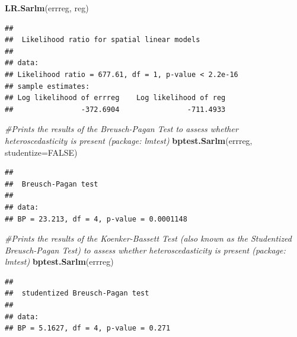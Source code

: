 \documentclass[
]{article}
\newenvironment{Shaded}{\begin{snugshade}}{\end{snugshade}}
\newcommand{\AttributeTok}[1]{\textcolor[rgb]{0.13,0.29,0.53}{#1}}
\newcommand{\CommentTok}[1]{\textcolor[rgb]{0.56,0.35,0.01}{\textit{#1}}}
\newcommand{\ConstantTok}[1]{\textcolor[rgb]{0.56,0.35,0.01}{#1}}
\newcommand{\FunctionTok}[1]{\textcolor[rgb]{0.13,0.29,0.53}{\textbf{#1}}}
\newcommand{\NormalTok}[1]{#1}
\newcommand{\SpecialCharTok}[1]{\textcolor[rgb]{0.81,0.36,0.00}{\textbf{#1}}}
\begin{document}
\begin{Shaded}
\begin{Highlighting}[]
\FunctionTok{LR.Sarlm}\NormalTok{(errreg, reg)}
\end{Highlighting}
\end{Shaded}

\begin{verbatim}
## 
##  Likelihood ratio for spatial linear models
## 
## data:  
## Likelihood ratio = 677.61, df = 1, p-value < 2.2e-16
## sample estimates:
## Log likelihood of errreg    Log likelihood of reg 
##                -372.6904                -711.4933
\end{verbatim}

\begin{Shaded}
\begin{Highlighting}[]
\CommentTok{\#Prints the results of the Breusch{-}Pagan Test to assess whether heteroscedasticity is present (package: lmtest)}
\FunctionTok{bptest.Sarlm}\NormalTok{(errreg, }\AttributeTok{studentize=}\ConstantTok{FALSE}\NormalTok{)}
\end{Highlighting}
\end{Shaded}

\begin{verbatim}
## 
##  Breusch-Pagan test
## 
## data:  
## BP = 23.213, df = 4, p-value = 0.0001148
\end{verbatim}

\begin{Shaded}
\begin{Highlighting}[]
\CommentTok{\#Prints the results of the Koenker{-}Bassett Test (also known as the Studentized Breusch{-}Pagan Test) to assess whether heteroscedasticity is present (package: lmtest)}
\FunctionTok{bptest.Sarlm}\NormalTok{(errreg)     }
\end{Highlighting}
\end{Shaded}

\begin{verbatim}
## 
##  studentized Breusch-Pagan test
## 
## data:  
## BP = 5.1627, df = 4, p-value = 0.271
\end{verbatim}

\begin{Shaded}
\end{Shaded}
\end{document}
